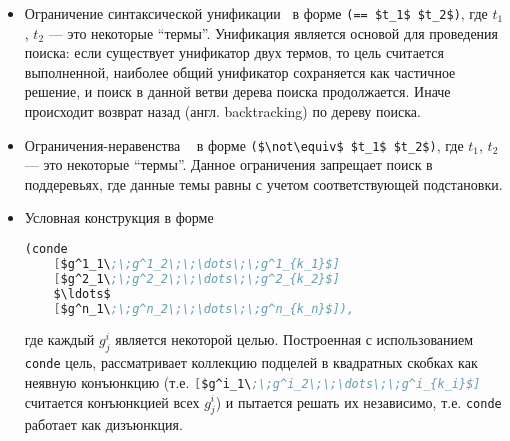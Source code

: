 \begin{itemize}
\item Ограничение синтаксической унификации~\cite{Unification} в форме \lstinline[language=scheme]|(== $t_1$ $t_2$)|, где  $t_1$, $t_2$ --- это некоторые \enquote{термы}.
Унификация является основой для проведения поиска: если существует унификатор двух термов, то цель считается выполненной, наиболее общий унификатор сохраняется как частичное решение, и поиск в данной ветви дерева поиска продолжается. Иначе происходит возврат назад (англ. backtracking) по дереву поиска.

\item Ограничения-неравенства ~\cite{CKanren} в форме \lstinline[language=scheme]|($\not\equiv$ $t_1$ $t_2$)|, где $t_1$, $t_2$ --- это некоторые \enquote{термы}.
Данное ограничения запрещает поиск в поддеревьях, где данные темы равны с учетом соответствующей подстановки.

\item Условная конструкция в форме %

\begin{lstlisting}[language=scheme]
(conde
    [$g^1_1\;\;g^1_2\;\;\dots\;\;g^1_{k_1}$]
    [$g^2_1\;\;g^2_2\;\;\dots\;\;g^2_{k_2}$]
    $\ldots$
    [$g^n_1\;\;g^n_2\;\;\dots\;\;g^n_{k_n}$]),
\end{lstlisting}

где каждый $g^i_j$ является некоторой целью. Построенная с использованием \lstinline|conde| цель, рассматривает коллекцию подцелей в квадратных скобках как неявную конъюнкцию (т.е. \lstinline[language=scheme]|[$g^i_1\;\;g^i_2\;\;\dots\;\;g^i_{k_i}$]| считается конъюнкцией всех $g^i_j$) и пытается решать их независимо, т.е. \lstinline|conde| работает как дизъюнкция.


\end{itemize}

